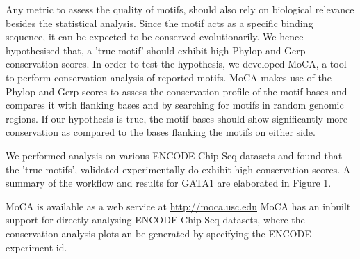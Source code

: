 \documentclass[16pt,a4paper]{article}
\begin{document}
Any metric to assess the quality of motifs, should also rely on biological relevance besides the statistical analysis. 
Since the motif acts as a specific binding sequence, it can be expected to be conserved evolutionarily. We hence hypothesised that, a 'true motif' should exhibit high Phylop\cite{siepel2006new} and Gerp\cite{davydov2010identifying} conservation scores.
In order to test the hypothesis, we developed MoCA, a tool to perform conservation analysis of reported motifs. MoCA makes use of the Phylop and Gerp scores to assess the conservation profile of the motif bases and compares it with flanking bases and by searching for motifs in random genomic regions. If our hypothesis is true, the motif bases should show significantly more conservation as compared to the bases flanking the motifs on either side. 

We performed analysis on various ENCODE Chip-Seq datasets and found that the 'true motifs', validated experimentally do exhibit high conservation scores. A summary of the workflow and results for GATA1 are elaborated in Figure 1.

MoCA is available as a web service at \url{http://moca.usc.edu}
MoCA has an inbuilt support for directly analysing ENCODE Chip-Seq datasets, where the conservation analysis plots an be generated by specifying the ENCODE experiment id. 


\end{document}
